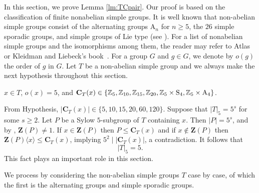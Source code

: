 \documentclass[12pt,reqno]{amsart}
\newcommand\A{\mathrm{A}} \newcommand\AGL{\mathrm{AGL}} \newcommand\AGammaL{\mathrm{A\Gamma L}} \newcommand\Alt{\mathrm{Alt}} \newcommand\ASL{\mathrm{ASL}} \newcommand\ASigmaL{\mathrm{A \Sigma L}} \newcommand\Aut{\mathrm{Aut}}
\def\C{\mathbf{C}}   \newcommand\Cay{\mathrm{Cay}}   \newcommand\Cos{\mathrm{Cos}} \newcommand{\CGammaSp}{\mathrm{C\Gamma Sp}}
\newcommand\Z{\mathbf{Z}} \newcommand\ZZ{\mathbb{Z}}
\numberwithin {equation} {section}
\begin{document}
In this section, we prove Lemma \ref{lm:TCpair}. Our proof is based on the classification of finite nonabelian simple groups. It is well known that non-abelian simple groups consist of the alternating  groups $\A_n$ for $n\geq 5$, the $26$  simple sporadic groups, and simple groups of Lie type (see \cite[Definition 2.2.8]{CFSG}). For a list of nonabelian simple
groups and the isomorphisms among them, the reader may refer to Atlas \cite[Chapters 1-3]{Atlas}
 or Kleidman and Liebeck's book~\cite[Tables 5.1.A-5.1.C and Theorem 5.1.2]{K-Lie}. For a group $G$ and $g\in G$, we denote by $o(g)$ the order of $g$ in $G$.
Let $T$ be a non-abelian simple group and we always make the next hypothesis throughout this section.

\vspace{0.2cm}
$x\in T$, $o(x)=5$, and $\C_T(x) \in \{ \ZZ_5,\ZZ_{10},\ZZ_{15},\ZZ_{20},\ZZ_5 \times\Sy_4, \ZZ_5 \times \A_4\}$.



From Hypothesis,
$|\C_T(x)| \in \{5,10,15,20,60,120 \}$. Suppose that $|T|_5=5^s$ for some $s\geq 2$. Let $P$ be  a Sylow $5$-subgroup of $T$ containing $x$. Then $|P|=5^s$, and by \cite[Chapter 1: Theorem 2.11]{DG}, $\Z(P)\not=1$.
If $x\in \Z(P)$ then $P\leq \C_T(x)$ and if $x\not\in \Z(P)$ then $\Z(P)\langle x\rangle \leq \C_T(x)$, implying $5^2\mid |\C_T(x)|$, a contradiction. It follows that \[|T|_5=5.\] This fact plays an important role in this section.

We process by considering the non-abelian simple groups $T$ case by case, of which the first is the alternating groups and simple sporadic  groups.
\end{document}
